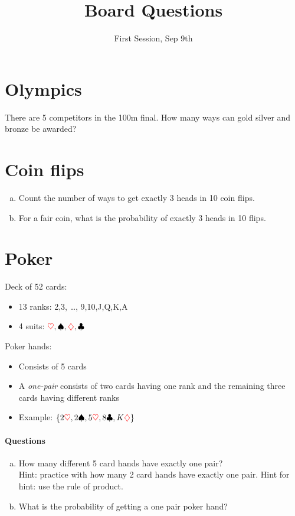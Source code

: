 \documentclass[11p,a4paper]{article}
\title{Board Questions}
\date{First Session, Sep 9th}
\begin{document}
\maketitle

\section{Olympics}
There are 5 competitors in the 100m final. How many ways can
gold silver and bronze be awarded?

\section{Coin flips}
\begin{enumerate}[a)]
\item Count the number of ways to get exactly 3 heads in 10 coin flips.
\item For a fair coin, what is the probability of exactly 3 heads in 10 flips.
\end{enumerate}

\section{Poker}
Deck of 52 cards:
\begin{itemize}
\item 13 ranks: 2,3, \ldots, 9,10,J,Q,K,A
\item 4 suits:  $ {\color{red} \heartsuit}, \spadesuit , {\color{red} \diamondsuit}, \clubsuit $
\end{itemize}
Poker hands:
\begin{itemize}
\item Consists of 5 cards
\item A \textit{one-pair} consists of two cards having one rank and the remaining three cards having 
different ranks
\item Example: $ \{2{\color{red} \heartsuit}, 2\spadesuit, 5{\color{red} \heartsuit}, 8\clubsuit, K{\color{red} \diamondsuit} \}  $
\end{itemize}

\paragraph{Questions}
\begin{enumerate}[a)]
\item How many different 5 card hands have exactly one pair? \\
Hint: practice with how many 2 card hands have exactly one pair.
Hint for hint: use the rule of product.
\item What is the probability of getting a one pair poker hand?
\end{enumerate}
\end{document}
